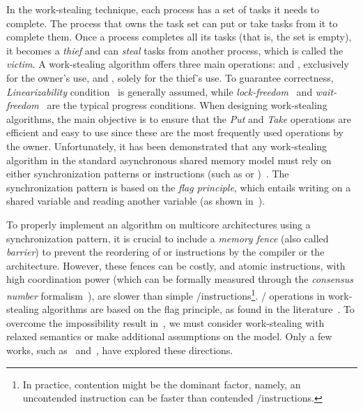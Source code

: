 In the work-stealing technique, each process has a set of tasks it needs to complete. The process that owns the task set can put or take tasks from it to complete them. Once a process completes all its tasks (that is, the set is empty), it becomes a \emph{thief} and can \emph{steal} tasks from another process, which is called the \emph{victim}. A work-stealing algorithm offers three main operations: \Put{} and \Take, exclusively for the owner's use, and \Steal, solely for the thief's use. To guarantee correctness, \emph{Linearizability} condition~\cite{DBLP_journals_toplas_HerlihyW90}  is generally assumed, while \emph{lock-freedom}~\cite{DBLP_journals_toplas_HerlihyW90}  and \emph{wait-freedom}~\cite{DBLP_journals_toplas_Herlihy91} are the typical progress conditions. When designing work-stealing algorithms, the main objective is to ensure that the \emph{Put} and \emph{Take} operations are efficient and easy to use since these are the most frequently used operations by the owner. Unfortunately, it has been demonstrated that any work-stealing algorithm in the standard asynchronous shared memory model must rely on either \RAW{} synchronization patterns or \emph{\RMW} instructions (such as \CAS{} or \TAS)~\cite{DBLP_conf_popl_AttiyaGHKMV11}. The \RAW{} synchronization pattern is based on the \emph{flag principle}, which entails writing on a shared variable and reading another variable (as shown in~\cite{DBLP_books_daglib_0020056}).

To properly implement an algorithm on multicore architectures using a synchronization pattern, it is crucial to include a \emph{memory fence} (also called \emph{barrier}) to prevent the reordering of \R or \W instructions by the compiler or the architecture. However, these fences can be costly, and atomic \RMW{} instructions, with high coordination power (which can be formally measured through the \emph{consensus number} formalism~\cite{DBLP_journals_toplas_Herlihy91}), are slower than simple \R/\W instructions\footnote{In practice, contention might be the dominant factor, namely, an uncontended \RMW{} instruction can be faster than contended \R/\W instructions.}. \Take/\Steal{} operations in work-stealing algorithms are based on the flag principle, as found in the literature~\cite{circular.work.stealing, DBLP_conf_pldi_FrigoLR98, non.blocking.work.stealing, 10.1145.571825.571876}. To overcome the impossibility result in~\cite{DBLP_conf_popl_AttiyaGHKMV11}, we must consider work-stealing with relaxed semantics or make additional assumptions on the model. Only a few works, such as~\cite{maged.vechev.2009} and~\cite{fencefreework}, have explored these directions.

